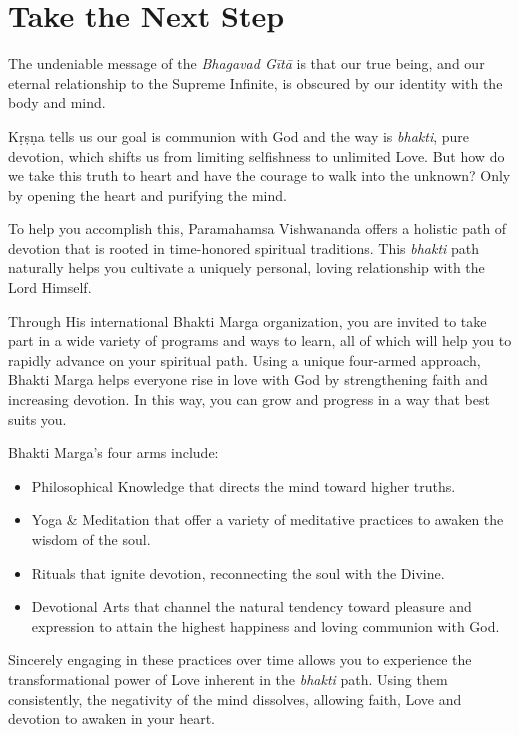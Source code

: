 \chapter*{Take the Next Step}\label{chap-take-the-next-step}

The undeniable message of the \textit{Bhagavad Gītā} is that our true being, and our eternal relationship to the Supreme Infinite, is obscured by our identity with the body and mind.


Kṛṣṇa tells us our goal is communion with God and the way is \textit{bhakti}, pure devotion, which shifts us from limiting selfishness to unlimited Love. But how do we take this truth to heart and have the courage to walk into the unknown? Only by opening the heart and purifying the mind. 

To help you accomplish this, Paramahamsa Vishwananda offers a holistic path of devotion that is rooted in time-honored spiritual traditions. This \textit{bhakti} path naturally helps you cultivate a uniquely personal, loving relationship with the Lord Himself.

Through His international Bhakti Marga organization, you are invited to take part in a wide variety of programs and ways to learn, all of which will help you to rapidly advance on your spiritual path. Using a unique four-armed approach, Bhakti Marga helps everyone rise in love with God by strengthening faith and increasing devotion. In this way, you can grow and progress in a way that best suits you.

Bhakti Marga's four arms include:
\begin{itemize}[itemsep=1pt, topsep=6pt]

\item Philosophical Knowledge that directs the
mind toward higher truths.

\item Yoga \& Meditation that offer a variety of
meditative practices to awaken the wisdom
of the soul.

\item Rituals that ignite devotion, reconnecting the
soul with the Divine.

\item Devotional Arts that channel the natural
tendency toward pleasure and expression
to attain the highest happiness and loving
communion with God.
\end{itemize}

Sincerely engaging in these practices over time allows you to experience the transformational power of Love inherent in the \textit{bhakti} path. Using them consistently, the negativity of the mind dissolves, allowing faith, Love and devotion to awaken in your heart.

